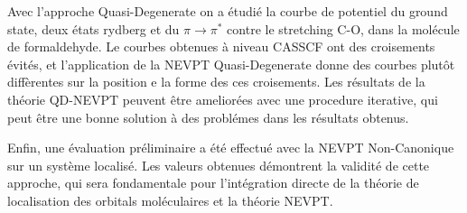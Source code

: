 Avec l'approche Quasi-Degenerate on a \'etudi\'e la courbe de potentiel du
ground state, deux \'etats rydberg et du $\pi \rightarrow \pi^{*}$ contre le
stretching C-O, dans la mol\'ecule de formaldehyde. Le courbes obtenues \`a niveau
CASSCF ont des croisements \'evit\'es, et l'application de la NEVPT
Quasi-Degenerate donne des courbes plut\^ot diff\`erentes sur la position e la
forme des ces croisements.  Les r\'esultats de la th\'eorie QD-NEVPT peuvent
\^etre amelior\'ees avec une procedure iterative, qui peut \^etre une bonne
solution \`a des probl\'emes dans les r\'esultats obtenus.

Enfin, une \'evaluation pr\'eliminaire a \'et\'e effectu\'e avec la NEVPT
Non-Canonique sur un syst\`eme localis\'e. Les valeurs obtenues d\'emontrent la validit\'e
de cette approche, qui sera fondamentale pour l'int\'egration directe de la
th\'eorie de localisation des orbitals mol\'eculaires et la th\'eorie NEVPT.


